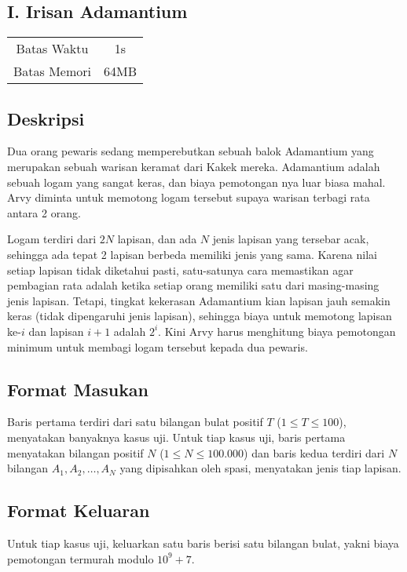 \documentclass{article}
\begin{document}
\begin{center}
    \section*{I. Irisan Adamantium} %

    \begin{tabular}{ | c c | }
        \hline
        Batas Waktu  & 1s \\    %
        Batas Memori & 64MB \\  %
        \hline
    \end{tabular}
\end{center}

\subsection*{Deskripsi}
Dua orang pewaris sedang memperebutkan sebuah balok Adamantium yang merupakan sebuah warisan keramat dari Kakek mereka.
Adamantium adalah sebuah logam yang sangat keras, dan biaya pemotongan nya luar biasa mahal.
Arvy diminta untuk memotong logam tersebut supaya warisan terbagi rata antara 2 orang.

Logam terdiri dari $2N$ lapisan, dan ada $N$ jenis lapisan yang tersebar acak, sehingga ada tepat 2 lapisan berbeda memiliki jenis yang sama.
Karena nilai setiap lapisan tidak diketahui pasti, satu-satunya cara memastikan agar pembagian rata adalah ketika setiap orang memiliki satu dari masing-masing jenis lapisan.
Tetapi, tingkat kekerasan Adamantium kian lapisan jauh semakin keras (tidak dipengaruhi jenis lapisan), sehingga biaya untuk memotong lapisan ke-$i$ dan lapisan $i+1$ adalah $2^i$.
Kini Arvy harus menghitung biaya pemotongan minimum untuk membagi logam tersebut kepada dua pewaris.

\subsection*{Format Masukan}
Baris pertama terdiri dari satu bilangan bulat positif $T$ ($1 \leq T \leq 100$), menyatakan banyaknya kasus uji.
Untuk tiap kasus uji, baris pertama menyatakan bilangan positif $N$ ($1 \leq N \leq 100.000$) dan baris kedua terdiri dari $N$ bilangan $A_1, A_2, \dots, A_N$ yang dipisahkan oleh spasi, menyatakan jenis tiap lapisan.

\subsection*{Format Keluaran}
Untuk tiap kasus uji, keluarkan satu baris berisi satu bilangan bulat, yakni biaya pemotongan termurah modulo ${10}^9+7$.
\\
\end{document}
